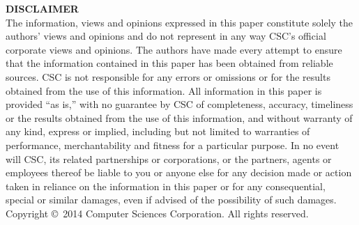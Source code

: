 \textbf{DISCLAIMER}\\

The information, views and opinions expressed in this paper constitute solely the authors’ views and opinions and do not represent in any way CSC’s official corporate views and opinions. The authors have made every attempt to ensure that the information contained in this paper has been obtained from reliable sources. CSC is not responsible for any errors or omissions or for the results obtained from the use of this information. All information in this paper is provided “as is,” with no guarantee by CSC of completeness, accuracy, timeliness or the results obtained from the use of this information, and without warranty of any kind, express or implied, including but not limited to warranties of performance, merchantability and fitness for a particular purpose. In no event will CSC, its related partnerships or corporations, or the partners, agents or employees thereof be liable to you or anyone else for any decision made or action taken in reliance on the information in this paper or for any consequential, special or similar damages, even if advised of the possibility of such damages.\\

Copyright \copyright~2014 Computer Sciences Corporation. All rights reserved.
